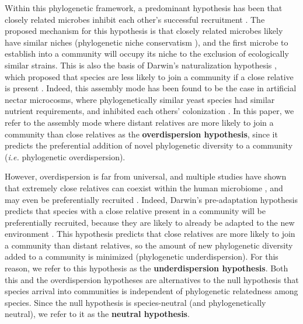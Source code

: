 \documentclass{article}
\begin{document}
\par
Within this phylogenetic framework, a predominant hypothesis has been that closely related microbes inhibit each other’s successful recruitment \cite{Nemergut2013,Fukami2015,Verster2018}. The proposed mechanism for this hypothesis is that closely related microbes likely have similar niches (phylogenetic niche conservatism \cite{Losos2008}), and the first microbe to establish into a community will occupy its niche to the exclusion of ecologically similar strains. This is also the basis of Darwin’s naturalization hypothesis \cite{Darwin1859}, which proposed that species are less likely to join a community if a close relative is present \cite{Ma2016}. Indeed, this assembly mode has been found to be the case in artificial nectar microcosms, where phylogenetically similar yeast species had similar nutrient requirements, and inhibited each others’ colonization \cite{Peay2012}. In this paper, we refer to the assembly mode where distant relatives are more likely to join a community than close relatives as the \textbf{overdispersion hypothesis}, since it predicts the preferential addition of novel phylogenetic diversity to a community (\emph{i.e.} phylogenetic overdispersion).
\par
However, overdispersion is far from universal, and multiple studies have shown that extremely close relatives can coexist within the human microbiome \cite{Li2016,Tett2019,Stecher2010}, and may even be preferentially recruited \cite{Brown2018}. Indeed, Darwin’s pre-adaptation hypothesis predicts that species with a close relative present in a community will be preferentially recruited, because they are likely to already be adapted to the new environment \cite{Darwin1859}. This hypothesis predicts that close relatives are more likely to join a community than distant relatives, so the amount of new phylogenetic diversity added to a community is minimized (phylogenetic underdispersion). For this reason, we refer to this hypothesis as the \textbf{underdispersion hypothesis}. Both this and the overdispersion hypotheses are alternatives to the null hypothesis that species arrival into communities is independent of phylogenetic relatedness among species. Since the null hypothesis is species-neutral (and phylogenetically neutral), we refer to it as the \textbf{neutral hypothesis}.
\par
\end{document}
